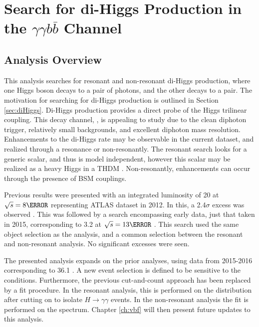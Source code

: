 \chapter{Search for di-Higgs Production in the $\gamma\gamma b\bar{b}$ Channel} %

\section{Analysis Overview}

This analysis searches for resonant and non-resonant di-Higgs production, where one Higgs boson decays to a pair of photons, and the other decays to a \bb pair. The motivation for searching for di-Higgs production is outlined in Section \ref{sec:diHiggs}. Di-Higgs production provides a direct probe of the Higgs trilinear coupling. This decay channel, \yybb, is appealing to study due to the clean diphoton trigger, relatively small backgrounds, and excellent diphoton mass resolution. Enhancements to the di-Higgs rate may be observable in the current \RunTwo dataset, and realized through a resonance or non-resonantly. The resonant search looks for a generic scalar, and thus is model independent, however this scalar may be realized as a heavy Higgs in a \gls{THDM} \cite{THDM}. Non-resonantly, enhancements can occur through the presence of \gls{BSM} couplings.


Previous results were presented with an integrated luminosity of 20 \ifb at $\sqrt{s}=\unit{8}{\TeV}$ representing ATLAS dataset in 2012. In this, a 2.4$\sigma$ excess was observed \cite{yybb-2015}. This was followed by a search encompassing early \RunTwo data, just that taken in 2015, corresponding to 3.2 \ifb at $\sqrt{s}=\unit{13}{\TeV}$ \cite{run2_2015}. This search used the same object selection as the \RunOne analysis, and a common selection between the resonant and non-resonant analysis. No significant excesses were seen.

The presented analysis expands on the prior analyses, using \RunTwo data from 2015-2016 corresponding to 36.1 \ifb. A new event selection is defined to be sensitive to the \RunTwo conditions. Furthermore, the previous cut-and-count approach has been replaced by a fit procedure. In the resonant analysis, this is performed on the \myybb distribution after cutting on \myy to isolate $H\rightarrow \gamma \gamma$ events. In the non-resonant analysis the fit is performed on the \myy spectrum. Chapter \ref{ch:vbf} will then present future updates to this analysis.


